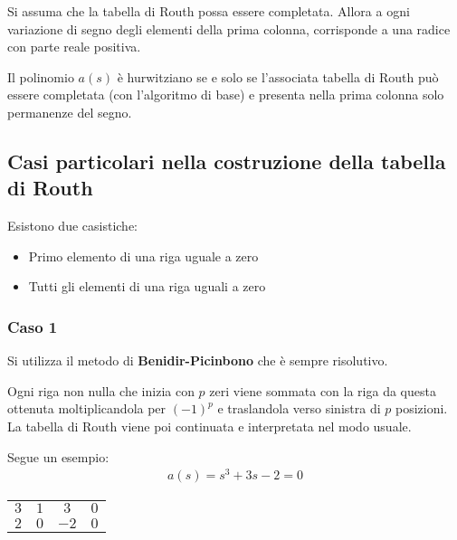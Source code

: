 \begin{definition}[Routh]
    Si assuma che la tabella di Routh possa essere completata.    
    Allora a ogni variazione di segno degli elementi della prima colonna,
    corrisponde a una radice con parte reale positiva.
\end{definition}

\begin{definition}
    Il polinomio $a(s)$ è hurwitziano se e solo se l'associata tabella di Routh
    può essere completata (con l'algoritmo di base) e presenta nella prima 
    colonna solo permanenze del segno.
\end{definition}

\subsection{Casi particolari nella costruzione della tabella di Routh}
Esistono due casistiche:
\begin{itemize}
    \item Primo elemento di una riga uguale a zero
    \item Tutti gli elementi di una riga uguali a zero
\end{itemize}


\subsubsection{Caso 1}
Si utilizza il metodo di \textbf{Benidir-Picinbono} che è sempre risolutivo.


\begin{theorem}
    Ogni riga non nulla che inizia con $p$ zeri viene sommata con la riga da questa ottenuta
    moltiplicandola per $(-1)^p$ e traslandola verso sinistra di $p$ posizioni.
    La tabella di Routh viene poi continuata e interpretata nel modo usuale.
\end{theorem}


Segue un esempio:
\begin{align}
    a(s) = s^3 + 3s -2 = 0
\end{align}

\begin{table}[h!]
    \centering
    \begin{tabular}{c | c c c}
        $3$ & $1$ & $3$ & $0$ \\
        $2$ & $0$ & $-2$ & $0$ \\
    \end{tabular}
\end{table}


